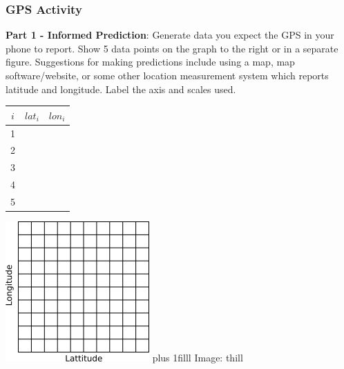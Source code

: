 \documentclass[fleqn]{beamer} %
\newcommand{\sectionIsubsectionIVtitle}{GPS Activity}
\newcommand{\btVFill}{\vskip0pt plus 1filll}
\begin{document}
			\begin{frame}
				\frametitle{\sectionIsubsectionIVtitle}
				\scriptsize
				{\bf Part 1 - Informed Prediction}: Generate data you expect the GPS in your phone to report. Show 5 data points on the graph to the right or in a separate figure. Suggestions for making predictions include using a map, map software/website, or some other location measurement system which reports latitude and longitude. Label the axis and scales used. \\
				
				\begin{multicols}{2}
					\setlength{\tabcolsep}{20pt}
					\renewcommand{\arraystretch}{1.4}
					\begin{tabular}{|c|c|c|} \hline
					$i$ & $lat_i$ & $lon_i$ \\\hline
					  1  & &              \\ \hline
					  2  & &              \\ \hline
					  3  & &              \\ \hline
					  4  & &              \\ \hline
					  5  & &              \\ \hline

					\end{tabular}

					\includegraphics[scale=.8]{images/lat_lon_grid.png}
					\btVFill
					{\tiny Image: thill}
				\end{multicols}	

			\end{frame}
\end{document}
